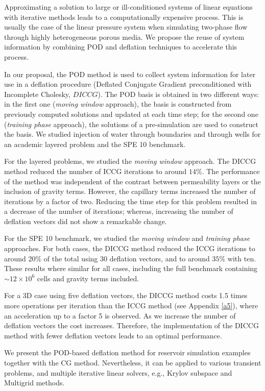 \documentclass[12pt]{article}
\begin{document}
{\hspace{0.5cm}Approximating a solution to large or ill-conditioned systems of linear equations with iterative methods leads to a computationally expensive process. This is usually the case of the linear pressure system when simulating two-phase flow through highly heterogeneous porous media.
We propose the reuse of system information by combining POD and deflation techniques to accelerate this process. \par
In our proposal, the POD method is used to collect system information for later use in a deflation procedure (Deflated Conjugate Gradient preconditioned with Incomplete Cholesky, $DICCG$). The POD basis is obtained in two different ways: 
in the first one (\emph{moving window} approach), the basis is constructed from previously computed solutions and updated at each time step; for the second one (\emph{training phase} approach), the solutions of a pre-simulation are used to construct the basis. We studied injection of water through boundaries and through wells for an academic layered problem and the SPE 10 benchmark.\par
 For the layered problems, we studied the \emph{moving window} approach. The DICCG method reduced the number of ICCG iterations to around $14\%$. The performance of the method was independent of the contrast between permeability layers or the inclusion of gravity terms. However, the capillary terms increased the number of iterations by a factor of two. Reducing the time step for this problem resulted in a decrease of the number of iterations; whereas, increasing the number of deflation vectors did not show a remarkable change. \par
 For the SPE 10 benchmark, we studied the \emph{moving window} and \emph{training phase} approaches. For both cases, the DICCG method reduced the ICCG iterations to around $20\%$ of the total using 30 deflation vectors, and to around $35\%$ 
 with ten. These results where similar for all cases, including the full benchmark containing $\sim 12 \times10^6$ cells and gravity terms included. \par
 For a 3D case using five deflation vectors, the DICCG method costs 1.5 times more operations per iteration than the ICCG method (see Appendix \ref{a5}), where an acceleration up to a factor 5 is observed. As we increase the number of deflation vectors the cost increases. 
 Therefore, the implementation of the DICCG method with fewer deflation vectors leads to an optimal performance. \par
 We present the POD-based deflation method for reservoir simulation examples together with the CG method. Nevertheless, it can be applied to various transient 
 problems, and multiple iterative linear solvers, e.g., Krylov subspace and Multigrid methods. 
 \vspace{-0.5cm}
 
}
\end{document}
